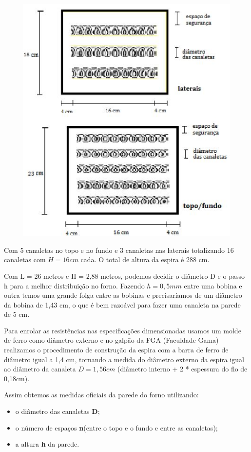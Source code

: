 \begin{figure}[!ht]
	\centering
	\label{resistencia2}
	\includegraphics[keepaspectratio=true,scale=1.0]{figuras/alimentacao4.JPG}
\end{figure}

Com 5 canaletas no topo e no fundo e 3 canaletas nas laterais totalizando 16 canaletas com $H=16 cm$ cada. O total de altura da espira é 288 cm.

Com L = 26 metros e H = 2,88 metros, podemos decidir o diâmetro D e o passo h para a melhor distribuição no forno. Fazendo $h = 0,5 mm$ entre uma bobina e outra temos uma grande folga entre as bobinas e precisaríamos de um diâmetro da bobina de 1,43 cm, o que é bem razoável para fazer uma canaleta na parede de 5 cm.

Para enrolar as resistências nas especificações dimensionadas usamos um molde de ferro como diâmetro externo e no galpão da FGA (Faculdade Gama) realizamos o procedimento de construção da espira com a barra de ferro de diâmetro igual a 1,4 cm, tornando a medida do diâmetro externo da espira igual ao diâmetro da canaleta $D = 1,56 cm$ (diâmetro interno + 2 * espessura do fio de 0,18cm).

Assim obtemos as medidas oficiais da parede do forno utilizando:
\begin{itemize}
	\item o diâmetro das canaletas \textbf{D};
	\item o número de espaços \textbf{n}(entre o topo e o fundo e entre as canaletas);
	\item a altura \textbf{h} da parede.
\end{itemize}

